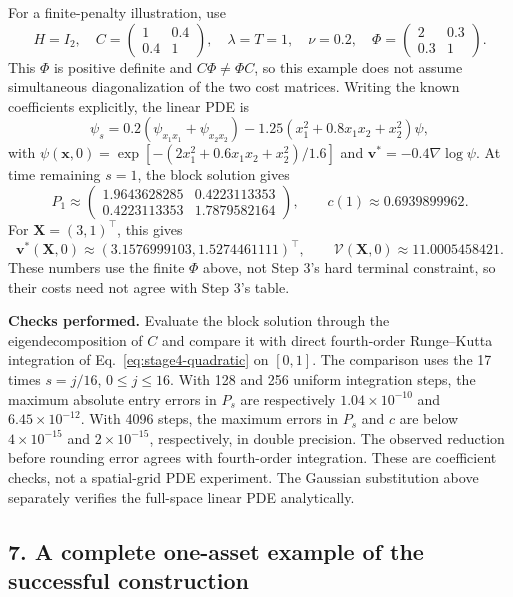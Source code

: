 For a finite-penalty illustration, use
\[
 H=I_2,\quad C=\begin{pmatrix}1&0.4\\0.4&1\end{pmatrix},\quad
 \lambda=T=1,\quad\nu=0.2,\quad
 \Phi=\begin{pmatrix}2&0.3\\0.3&1\end{pmatrix}.
\]
This $\Phi$ is positive definite and $C\Phi\ne\Phi C$, so this example
does not assume simultaneous diagonalization of the two cost matrices.
Writing the known coefficients explicitly, the linear PDE is
\begin{equation}
 \boxed{\psi_s=0.2(\psi_{x_1x_1}+\psi_{x_2x_2})
 -1.25(x_1^2+0.8x_1x_2+x_2^2)\psi,}
 \label{eq:stage4-twoasset}
\end{equation}
with
$\psi(\mathbf x,0)=\exp[-(2x_1^2+0.6x_1x_2+x_2^2)/1.6]$ and
$\mathbf v^*=-0.4\nabla\log\psi$.
At time remaining $s=1$, the block solution gives
\[
 P_1\approx\begin{pmatrix}
 1.9643628285&0.4223113353\\0.4223113353&1.7879582164
 \end{pmatrix},\qquad c(1)\approx0.6939899962.
\]
For $\mathbf X=(3,1)^\top$, this gives
\[
 \mathbf v^*(\mathbf X,0)\approx
 (3.1576999103,1.5274461111)^\top,\qquad
 \mathcal V(\mathbf X,0)\approx11.0005458421.
\]
These numbers use the finite $\Phi$ above, not Step 3's hard terminal
constraint, so their costs need not agree with Step 3's table.

\textbf{Checks performed.} Evaluate the block solution through the
eigendecomposition of $C$ and compare it with direct fourth-order
Runge--Kutta integration of Eq.~\eqref{eq:stage4-quadratic} on $[0,1]$.
The comparison uses the 17 times $s=j/16$, $0\le j\le16$.
With 128 and 256 uniform integration steps, the maximum absolute entry
errors in $P_s$ are respectively $1.04\times10^{-10}$ and
$6.45\times10^{-12}$. With 4096 steps, the maximum errors in $P_s$
and $c$ are below $4\times10^{-15}$ and $2\times10^{-15}$,
respectively, in double precision. The observed reduction before rounding
error agrees with fourth-order integration. These are coefficient checks,
not a spatial-grid PDE experiment. The Gaussian substitution above
separately verifies the full-space linear PDE analytically.

\subsection*{7. A complete one-asset example of the successful construction}

